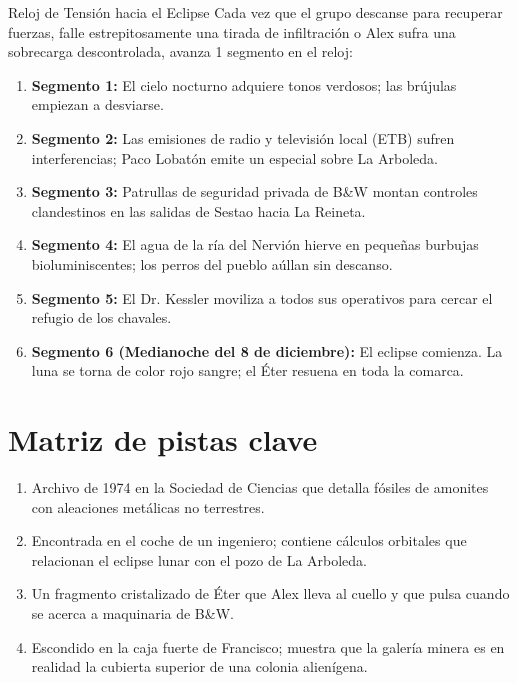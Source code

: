\begin{CajaRegla}{Reloj de Tensión hacia el Eclipse}
Cada vez que el grupo descanse para recuperar fuerzas, falle estrepitosamente una tirada de infiltración o Alex sufra una sobrecarga descontrolada, avanza 1 segmento en el reloj:
\begin{enumerate}
  \item \textbf{Segmento 1:} El cielo nocturno adquiere tonos verdosos; las brújulas empiezan a desviarse.
  \item \textbf{Segmento 2:} Las emisiones de radio y televisión local (ETB) sufren interferencias; Paco Lobatón emite un especial sobre La Arboleda.
  \item \textbf{Segmento 3:} Patrullas de seguridad privada de B\&W montan controles clandestinos en las salidas de Sestao hacia La Reineta.
  \item \textbf{Segmento 4:} El agua de la ría del Nervión hierve en pequeñas burbujas bioluminiscentes; los perros del pueblo aúllan sin descanso.
  \item \textbf{Segmento 5:} El Dr. Kessler moviliza a todos sus operativos para cercar el refugio de los chavales.
  \item \textbf{Segmento 6 (Medianoche del 8 de diciembre):} El eclipse comienza. La luna se torna de color rojo sangre; el Éter resuena en toda la comarca.
\end{enumerate}
\end{CajaRegla}

\section{Matriz de pistas clave}

\begin{enumerate}
  \item {} Archivo de 1974 en la Sociedad de Ciencias que detalla fósiles de amonites con aleaciones metálicas no terrestres.
  \item {} Encontrada en el coche de un ingeniero; contiene cálculos orbitales que relacionan el eclipse lunar con el pozo de La Arboleda.
  \item {} Un fragmento cristalizado de Éter que Alex lleva al cuello y que pulsa cuando se acerca a maquinaria de B\&W.
  \item {} Escondido en la caja fuerte de Francisco; muestra que la galería minera es en realidad la cubierta superior de una colonia alienígena.
\end{enumerate}
